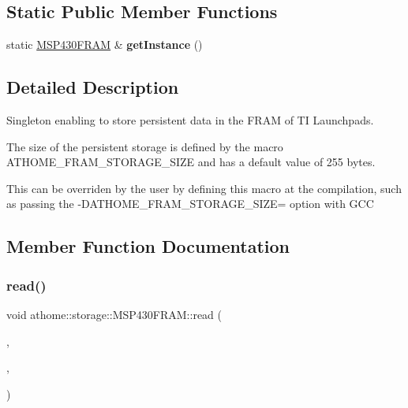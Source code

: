 \subsection*{Static Public Member Functions}
\begin{DoxyCompactItemize}
\item 
\mbox{\label{classathome_1_1storage_1_1_m_s_p430_f_r_a_m_a8ff985af129a1193de59141d1fed2052}} 
static \mbox{\hyperlink{classathome_1_1storage_1_1_m_s_p430_f_r_a_m}{M\+S\+P430\+F\+R\+AM}} \& {\bfseries get\+Instance} ()
\end{DoxyCompactItemize}


\subsection{Detailed Description}
Singleton enabling to store persistent data in the F\+R\+AM of TI Launchpads.

The size of the persistent storage is defined by the macro A\+T\+H\+O\+M\+E\+\_\+\+F\+R\+A\+M\+\_\+\+S\+T\+O\+R\+A\+G\+E\+\_\+\+S\+I\+ZE and has a default value of 255 bytes.

This can be overriden by the user by defining this macro at the compilation, such as passing the {\ttfamily -\/\+D\+A\+T\+H\+O\+M\+E\+\_\+\+F\+R\+A\+M\+\_\+\+S\+T\+O\+R\+A\+G\+E\+\_\+\+S\+I\+ZE=} option with G\+CC 

\subsection{Member Function Documentation}
\mbox{\label{classathome_1_1storage_1_1_m_s_p430_f_r_a_m_a3a00a26565491d08d26f505930453fb7}} 
\subsubsection{\texorpdfstring{read()}{read()}}
{\footnotesize\ttfamily void athome\+::storage\+::\+M\+S\+P430\+F\+R\+A\+M\+::read (\begin{DoxyParamCaption}\item[{size\+\_\+t}]{,  }\item[{void $\ast$}]{,  }\item[{size\+\_\+t}]{ }\end{DoxyParamCaption})\hspace{0.3cm}{\ttfamily [virtual]}}

